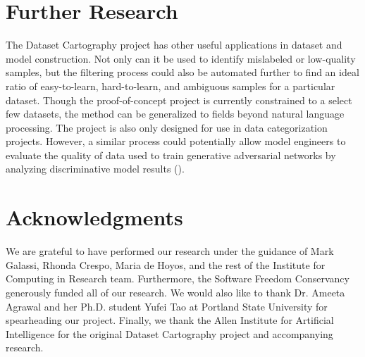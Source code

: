 \documentclass[11pt, a4paper, twocolumn]{article}
\begin{document}
	\section{Further Research}
	
	The Dataset Cartography project has other useful applications in dataset and model construction. Not only can it be used to identify mislabeled or low-quality samples, but the filtering process could also be automated further to find an ideal ratio of easy-to-learn, hard-to-learn, and ambiguous samples for a particular dataset. Though the proof-of-concept project is currently constrained to a select few datasets, the method can be generalized to fields beyond natural language processing. The project is also only designed for use in data categorization projects. However, a similar process could potentially allow model engineers to evaluate the quality of data used to train generative adversarial networks by analyzing discriminative model results (\cite{1406.2661}).
	
	\section{Acknowledgments}
	
	We are grateful to have performed our research under the guidance of Mark Galassi, Rhonda Crespo, Maria de Hoyos, and the rest of the Institute for Computing in Research team. Furthermore, the Software Freedom Conservancy generously funded all of our research. We would also like to thank Dr. Ameeta Agrawal and her Ph.D. student Yufei Tao at Portland State University for spearheading our project. Finally, we thank the Allen Institute for Artificial Intelligence for the original Dataset Cartography project and accompanying research.
	
	
	
	\nocite{*}
	
	\printbibliography[title={Bibliography}]
	
\end{document}
